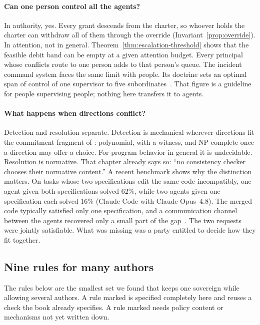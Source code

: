 \paragraph{Can one person control all the agents?} In authority, yes. Every grant descends from the charter,
so whoever holds the charter can withdraw all of them through the override
(Invariant~\ref{prop:override}). In attention, not in general.
Theorem~\ref{thm:escalation-threshold} shows that the feasible debit band can
be empty at a given attention budget. Every principal whose conflicts route to
one person adds to that person's queue. The incident command system faces the
same limit with people. Its doctrine sets an optimal span of control of one
supervisor to five subordinates~. That figure is a
guideline for people supervising people; nothing here transfers it to agents.

\paragraph{What happens when directions conflict?} Detection and resolution
separate. Detection is mechanical wherever directions fit the commitment
fragment of : polynomial, with a witness,
and NP-complete once a direction may offer a choice. For program behavior in
general it is undecidable. Resolution is normative. That chapter already says
so: ``no consistency checker chooses their normative content.'' A recent
benchmark shows why the distinction matters. On tasks whose two
specifications edit the same code incompatibly, one agent given both
specifications solved $62\%$, while two agents given one specification each
solved $16\%$ (Claude Code with Claude Opus~4.8). The merged code typically
satisfied only one specification, and a communication channel between the
agents recovered only a small part of the gap~.
The two requests were jointly satisfiable. What was missing was a party
entitled to decide how they fit together.

\subsection{Nine rules for many authors}\label{sec:ls-many-authors-rules}

The rules below are the smallest set we found that keeps one sovereign while
allowing several authors. A rule marked \Designed{} is specified completely
here and reuses a check the book already specifies. A rule marked \Vision{}
needs policy content or mechanisms not yet written down.

